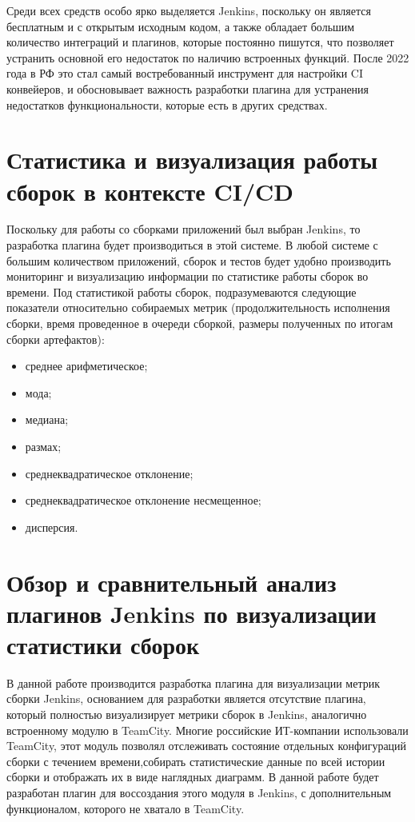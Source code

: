 Среди всех средств особо ярко выделяется Jenkins, поскольку он является бесплатным и с открытым исходным кодом, а также обладает большим количество интеграций и плагинов, которые постоянно пишутся, что позволяет устранить основной его недостаток по наличию встроенных функций. После 2022 года в РФ это стал самый востребованный инструмент для настройки CI конвейеров, и обосновывает важность разработки плагина для устранения недостатков функциональности, которые есть в других средствах.
 
 
 \section{Статистика и визуализация работы сборок в контексте CI/CD} \label{ch1:sec4}
 
Поскольку для работы со сборками приложений был выбран Jenkins, то разработка плагина будет производиться в этой системе. В любой системе с большим количеством приложений, сборок и тестов будет удобно производить мониторинг и визуализацию информации по статистике работы сборок во времени. Под статистикой работы сборок, подразумеваются следующие показатели относительно собираемых метрик (продолжительность исполнения сборки, время проведенное в очереди сборкой, размеры полученных по итогам сборки артефактов):
 
\begin{itemize}
	\item среднее арифметическое;
	\item мода;
	\item медиана;
	\item размах;
	\item среднеквадратическое отклонение;
	\item среднеквадратическое отклонение несмещенное;
	\item дисперсия.
\end{itemize}
 
	
\section{Обзор и сравнительный анализ плагинов Jenkins по визуализации статистики сборок} \label{ch1:sec5}

В данной работе производится разработка плагина для визуализации метрик сборки Jenkins, основанием для разработки является отсутствие плагина, который полностью визуализирует метрики сборок в Jenkins, аналогично встроенному модулю в TeamCity. Многие российские ИТ-компании использовали TeamCity, этот модуль позволял отслеживать состояние отдельных конфигураций сборки с течением времени,собирать статистические данные по всей истории сборки и отображать их в виде наглядных диаграмм. В данной работе будет разработан плагин для воссоздания этого модуля в Jenkins, с дополнительным функционалом, которого не хватало в TeamCity.

